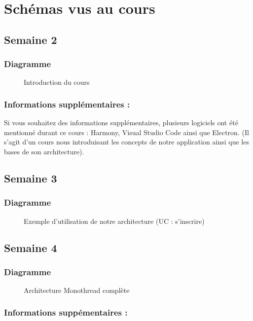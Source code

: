 \documentclass{article}[12pt]
\begin{document}


\tableofcontents%
\newpage
\section{Schémas vus au cours}
\subsection{Semaine 2}
\subsubsection{Diagramme}
\begin{figure}[H]
    \centering
    \caption{Introduction du cours}
\end{figure}
\subsubsection{Informations supplémentaires : }
Si vous souhaitez des informations supplémentaires, plusieurs logiciels ont été mentionné durant ce cours : Harmony, Visual Studio Code ainsi que Electron. (Il s'agit d'un cours nous introduisant les concepts de notre application ainsi que les bases de son architecture).
\subsection{Semaine 3}
\subsubsection{Diagramme}
\begin{figure}[H]
    \centering
    \caption{Exemple d'utilisation de notre architecture (UC : s'inscrire)}
\end{figure}
\subsection{Semaine 4}
\subsubsection{Diagramme}
\begin{figure}[H]
    \centering
    \caption{Architecture Monothread complète}
\end{figure}
\subsubsection{Informations suppémentaires : } 
\end{document}
